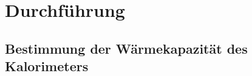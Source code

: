 \section{Durchführung}
\label{sec:Durchführung}
\subsection{Bestimmung der Wärmekapazität des Kalorimeters}
\label{sec:D1}
